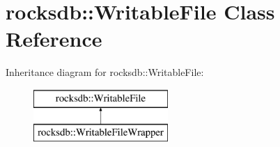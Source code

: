 \hypertarget{classrocksdb_1_1WritableFile}{}\section{rocksdb\+:\+:Writable\+File Class Reference}
\label{classrocksdb_1_1WritableFile}
Inheritance diagram for rocksdb\+:\+:Writable\+File\+:\begin{figure}[H]
\begin{center}
\leavevmode
\includegraphics[height=2.000000cm]{classrocksdb_1_1WritableFile}
\end{center}
\end{figure}
